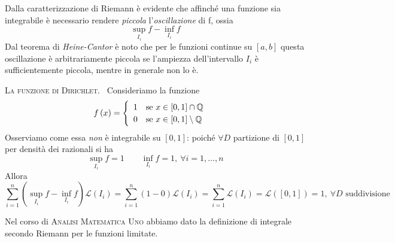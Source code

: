 Dalla caratterizzazione di Riemann è evidente che affinché una funzione sia integrabile è necessario rendere \textit{piccola} l’\textit{oscillazione} di f, ossia
\begin{equation*}
	\sup_{I_i}f-\inf_{I_i}f
\end{equation*}
Dal teorema di \textit{Heine-Cantor} è noto che per le funzioni continue su $\left[a,b\right]$ questa oscillazione è arbitrariamente piccola se l’ampiezza dell’intervallo $I_i$ è
sufficientemente piccola, mentre in generale non lo è.
\begin{example}\textsc{La funzione di Dirichlet.}~{}
	Consideriamo la funzione
	\begin{equation}
		f\left(x\right)=
		\begin{cases}
			\begin{array}{ll}
				1&\text{se }x\in\left[0,1\right]\cap\mathbb{Q}\\
				0&\text{se }x\in\left[0,1\right]\setminus\mathbb{Q}\\
			\end{array}
		\end{cases}
	\end{equation}
Osserviamo come essa \textit{non} è integrabile su $\left[0,1\right]$: poiché $\forall D$ partizione di $\left[0,1\right]$ per densità dei razionali si ha
\begin{equation*}
	\sup_{I_i}f=1\qquad	\inf_{I_i}f=1,\ \forall i=1,\ldots,n
\end{equation*}
Allora
\begin{equation*}
	\sum_{i=1}^{n}\left(\sup_{I_i}f-\inf_{I_i}f\right)\mathcal{L}\left(I_i\right)=\sum_{i=1}^{n}\left(1-0\right)\mathcal{L}\left(I_i\right)=\sum_{i=1}^{n}\mathcal{L}\left(I_i\right)=\mathcal{L}\left(\left[0,1\right]\right)=1,\ \forall D\text{ suddivisione}
\end{equation*}
\end{example}
Nel corso di \textsc{Analisi Matematica Uno} abbiamo dato la definizione di integrale secondo Riemann per le funzioni limitate.
